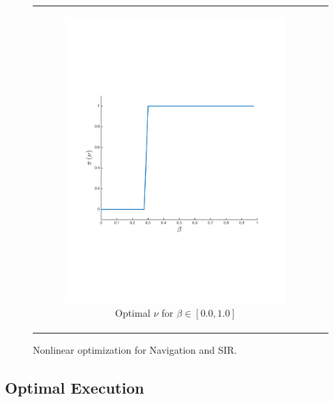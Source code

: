 {\begin{figure}[t!]
\begin{tabular}{cc}
			\begin{subfigure}{0.2\textwidth}\centering\includegraphics[width=\textwidth]{images/sir_opt_new}\caption{Optimal {\footnotesize $ \nu $} for {\footnotesize $ \beta \in \left[ 0.0, 1.0 \right] $}}\label{fig:sir_opt}\end{subfigure}
			\\
		\end{tabular}
		\caption{Nonlinear optimization for Navigation and SIR.}        
		\label{tab:opt_results}
		\vspace{-3mm}
	\end{figure}
}

\subsection{Optimal Execution}
\label{sec:results_oe}

